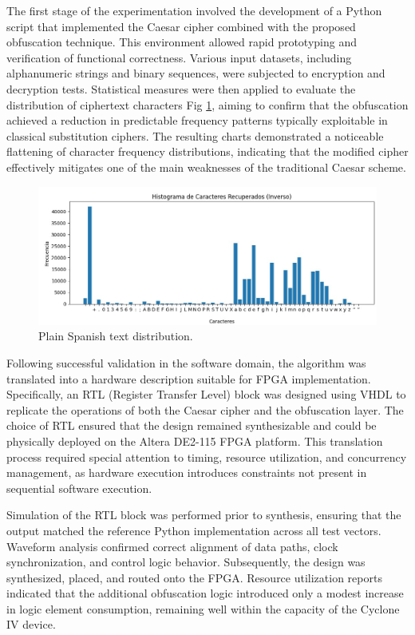 \documentclass[journal,article,submit,pdftex,moreauthors]{Definitions/mdpi}
\begin{document}
The first stage of the experimentation involved the development of a Python script that implemented the Caesar cipher combined with the proposed obfuscation technique. This environment allowed rapid prototyping and verification of functional correctness. Various input datasets, including alphanumeric strings and binary sequences, were subjected to encryption and decryption tests. Statistical measures were then applied to evaluate the distribution of ciphertext characters Fig \ref{fig1}, aiming to confirm that the obfuscation achieved a reduction in predictable frequency patterns typically exploitable in classical substitution ciphers. The resulting charts demonstrated a noticeable flattening of character frequency distributions, indicating that the modified cipher effectively mitigates one of the main weaknesses of the traditional Caesar scheme.
\unskip
\begin{figure}[H]
 \includegraphics[width=1\textwidth, height=5 cm]{imagenes/img1} %
\caption{Plain Spanish text distribution.\label{fig1}}
\end{figure}   
\unskip


Following successful validation in the software domain, the algorithm was translated into a hardware description suitable for FPGA implementation. Specifically, an RTL (Register Transfer Level) block was designed using VHDL to replicate the operations of both the Caesar cipher and the obfuscation layer. The choice of RTL ensured that the design remained synthesizable and could be physically deployed on the Altera DE2-115 FPGA platform. This translation process required special attention to timing, resource utilization, and concurrency management, as hardware execution introduces constraints not present in sequential software execution.

Simulation of the RTL block was performed prior to synthesis, ensuring that the output matched the reference Python implementation across all test vectors. Waveform analysis confirmed correct alignment of data paths, clock synchronization, and control logic behavior. Subsequently, the design was synthesized, placed, and routed onto the FPGA. Resource utilization reports indicated that the additional obfuscation logic introduced only a modest increase in logic element consumption, remaining well within the capacity of the Cyclone IV device.
\end{document}
